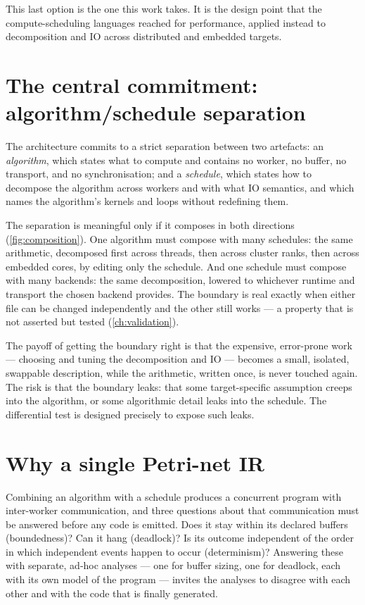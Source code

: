 This last option is the one this work takes. It is the design point that the
compute-scheduling languages reached for performance, applied instead to
decomposition and IO across distributed and embedded targets.

\section{The central commitment: algorithm/schedule separation}\label{sec:prob-split}

The architecture commits to a strict separation between two artefacts: an
\emph{algorithm}, which states what to compute and contains no worker, no buffer,
no transport, and no synchronisation; and a \emph{schedule}, which states how to
decompose the algorithm across workers and with what IO semantics, and which
names the algorithm's kernels and loops without redefining them.

The separation is meaningful only if it composes in both directions
(\cref{fig:composition}). One algorithm must compose with many schedules: the
same arithmetic, decomposed first across threads, then across cluster ranks, then
across embedded cores, by editing only the schedule. And one schedule must
compose with many backends: the same decomposition, lowered to whichever runtime
and transport the chosen backend provides. The boundary is real exactly when
either file can be changed independently and the other still works --- a property
that is not asserted but tested (\cref{ch:validation}).



The payoff of getting the boundary right is that the expensive, error-prone work
--- choosing and tuning the decomposition and IO --- becomes a small, isolated,
swappable description, while the arithmetic, written once, is never touched
again. The risk is that the boundary leaks: that some target-specific assumption
creeps into the algorithm, or some algorithmic detail leaks into the schedule.
The differential test is designed precisely to expose such leaks.

\section{Why a single Petri-net IR}\label{sec:prob-petri-ir}

Combining an algorithm with a schedule produces a concurrent program with
inter-worker communication, and three questions about that communication must be
answered before any code is emitted. Does it stay within its declared buffers
(boundedness)? Can it hang (deadlock)? Is its outcome independent of the order in
which independent events happen to occur (determinism)? Answering these with
separate, ad-hoc analyses --- one for buffer sizing, one for deadlock, each with
its own model of the program --- invites the analyses to disagree with each other
and with the code that is finally generated.

